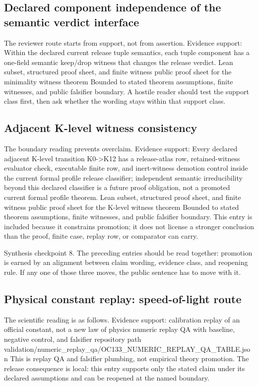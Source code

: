 \subsection{Declared component independence of the semantic verdict interface}
The reviewer route starts from support, not from assertion. Evidence support: Within the declared current release tuple semantics, each tuple component has a one-field semantic keep/drop witness that changes the release verdict. Lean subset, structured proof sheet, and finite witness public proof sheet for the minimality witness theorem Bounded to stated theorem assumptions, finite witnesses, and public falsifier boundary. A hostile reader should test the support class first, then ask whether the wording stays within that support class.

\subsection{Adjacent K-level witness consistency}
The boundary reading prevents overclaim. Evidence support: Every declared adjacent K-level transition K0-\textgreater{}K12 has a release-atlas row, retained-witness evaluator check, executable finite row, and inert-witness demotion control inside the current formal profile release classifier; independent semantic irreducibility beyond this declared classifier is a future proof obligation, not a promoted current formal profile theorem. Lean subset, structured proof sheet, and finite witness public proof sheet for the K-level witness theorem Bounded to stated theorem assumptions, finite witnesses, and public falsifier boundary. This entry is included because it constrains promotion; it does not license a stronger conclusion than the proof, finite case, replay row, or comparator can carry.

Synthesis checkpoint 8. The preceding entries should be read together: promotion is earned by an alignment between claim wording, evidence class, and reopening rule. If any one of those three moves, the public sentence has to move with it.

\subsection{Physical constant replay: speed-of-light route}
The scientific reading is as follows. Evidence support: calibration replay of an official constant, not a new law of physics numeric replay QA with baseline, negative control, and falsifier repository path validation/numeric\_replay\_qa/OC133\_NUMERIC\_REPLAY\_QA\_TABLE.json This is replay QA and falsifier plumbing, not empirical theory promotion. The release consequence is local: this entry supports only the stated claim under its declared assumptions and can be reopened at the named boundary.

